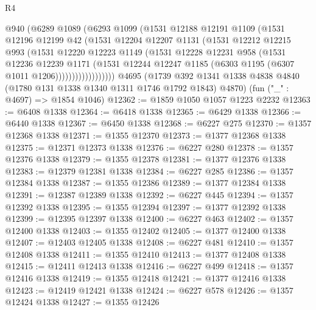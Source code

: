 \begin{lexlean}{R4}
\begin{coremodule}
                @940
                (@6289
                  @1089
                  (@6293
                    @1099
                    (@1531
                      @12188
                      @12191
                      @1109
                      (@1531
                        @12196
                        @12199
                        @42
                        (@1531
                          @12204
                          @12207
                          @1131
                          (@1531
                            @12212
                            @12215
                            @993
                            (@1531
                              @12220
                              @12223
                              @1149
                              (@1531
                                @12228
                                @12231
                                @958
                                (@1531
                                  @12236
                                  @12239
                                  @1171
                                  (@1531
                                    @12244
                                    @12247
                                    @1185
                                    (@6303 @1195 (@6307 @1011 @1206))))))))))))))))))
    @4695
    (@1739 @392 @1341 @1338 @4838 @4840 (@1780 @131 @1338 @1340 @1311 @1746 @1792 @1843) @4870)
    (fun ("_" : @4697) => @1854 @1046)
@12362 := @1859 @1050 @1057 @1223 @2232
@12363 := @6408 @1338
@12364 := @6418 @1338
@12365 := @6429 @1338
@12366 := @6440 @1338
@12367 := @6450 @1338
@12368 := @6227 @275
@12370 := @1357 @12368 @1338
@12371 := @1355 @12370
@12373 := @1377 @12368 @1338
@12375 := @12371 @12373 @1338
@12376 := @6227 @280
@12378 := @1357 @12376 @1338
@12379 := @1355 @12378
@12381 := @1377 @12376 @1338
@12383 := @12379 @12381 @1338
@12384 := @6227 @285
@12386 := @1357 @12384 @1338
@12387 := @1355 @12386
@12389 := @1377 @12384 @1338
@12391 := @12387 @12389 @1338
@12392 := @6227 @445
@12394 := @1357 @12392 @1338
@12395 := @1355 @12394
@12397 := @1377 @12392 @1338
@12399 := @12395 @12397 @1338
@12400 := @6227 @463
@12402 := @1357 @12400 @1338
@12403 := @1355 @12402
@12405 := @1377 @12400 @1338
@12407 := @12403 @12405 @1338
@12408 := @6227 @481
@12410 := @1357 @12408 @1338
@12411 := @1355 @12410
@12413 := @1377 @12408 @1338
@12415 := @12411 @12413 @1338
@12416 := @6227 @499
@12418 := @1357 @12416 @1338
@12419 := @1355 @12418
@12421 := @1377 @12416 @1338
@12423 := @12419 @12421 @1338
@12424 := @6227 @578
@12426 := @1357 @12424 @1338
@12427 := @1355 @12426

\end{coremodule}
\end{lexlean}
